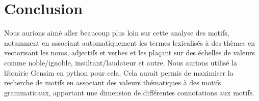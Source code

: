 \section{Conclusion}

Nous aurions aimé aller beaucoup plus loin sur cette analyse des motifs, notamment en associant automatiquement les termes lexicalisés à des thèmes en vectorisant les noms, adjectifs et verbes et les plaçant sur des échelles de valeurs comme noble/ignoble, insultant/laudateur et autre. Nous aurions utilisé la librairie Gensim en python pour cela. Cela aurait permis de maximiser la recherche de motifs en associant des valeurs thématiques à des motifs grammaticaux, apportant une dimension de différentes connotations aux motifs.